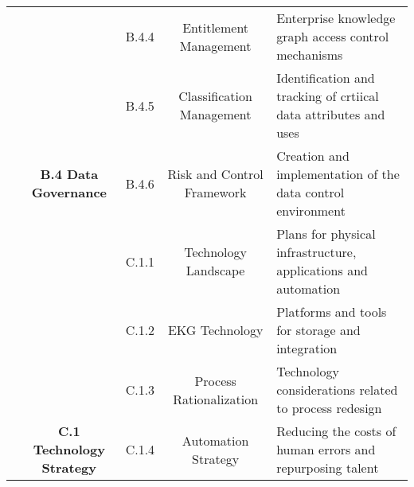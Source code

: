 \begin{table}[ht]
\begin{tabular}{@{}cclcl@{}}
    \cellcolor[HTML]{2F5496}{}                                            & \cellcolor[HTML]{8EAADB}                                                           & \cellcolor[HTML]{B4C6E7}B.4.4 & \cellcolor[HTML]{B4C6E7}Entitlement Management       & \cellcolor[HTML]{D9E2F3}Enterprise knowledge graph access control mechanisms                   \\
    \cellcolor[HTML]{2F5496}{}                                            & \cellcolor[HTML]{8EAADB}                                                           & \cellcolor[HTML]{B4C6E7}B.4.5 & \cellcolor[HTML]{B4C6E7}Classification Management    & \cellcolor[HTML]{D9E2F3}Identification and tracking of crtiical data attributes and uses       \\
    \multirow{-16}{*}{\cellcolor[HTML]{2F5496}{
        \rotatebox{90}{\textbf{B. DATA}}}}                                & \multirow{-6}{*}{\cellcolor[HTML]{8EAADB}\textbf{B.4 Data Governance}}             & \cellcolor[HTML]{B4C6E7}B.4.6 & \cellcolor[HTML]{B4C6E7}Risk and Control Framework   & \cellcolor[HTML]{D9E2F3}Creation and implementation of the data control environment            \\
    \cellcolor[HTML]{BF9000}{}                                            & \cellcolor[HTML]{FFD965}                                                           & \cellcolor[HTML]{FFE598}C.1.1 & \cellcolor[HTML]{FFE598}Technology Landscape         & \cellcolor[HTML]{FEF2CB}Plans for physical infrastructure, applications and automation         \\
    \cellcolor[HTML]{BF9000}{}                                            & \cellcolor[HTML]{FFD965}                                                           & \cellcolor[HTML]{FFE598}C.1.2 & \cellcolor[HTML]{FFE598}EKG Technology               & \cellcolor[HTML]{FEF2CB}Platforms and tools for storage and integration                        \\
    \cellcolor[HTML]{BF9000}{}                                            & \cellcolor[HTML]{FFD965}                                                           & \cellcolor[HTML]{FFE598}C.1.3 & \cellcolor[HTML]{FFE598}Process Rationalization      & \cellcolor[HTML]{FEF2CB}Technology considerations related to process redesign                  \\
    \cellcolor[HTML]{BF9000}{}                                            & \multirow{-4}{*}{\cellcolor[HTML]{FFD965}\textbf{C.1 Technology Strategy}}         & \cellcolor[HTML]{FFE598}C.1.4 & \cellcolor[HTML]{FFE598}Automation Strategy          & \cellcolor[HTML]{FEF2CB}Reducing the costs of human errors and repurposing talent              \\

\end{tabular}
\end{table}
